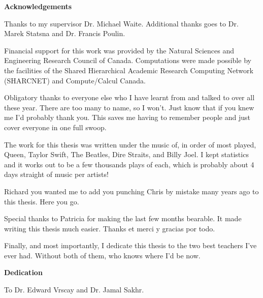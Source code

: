
\begin{center}\textbf{Acknowledgements}\end{center}
Thanks to my supervisor Dr. Michael Waite. Additional thanks goes to Dr. Marek Statsna and Dr. Francis Poulin. 

Financial support for this work was provided by the Natural Sciences and Engineering Research Council of Canada. Computations were made possible by the facilities of the Shared Hierarchical Academic Research Computing Network (SHARCNET) and Compute/Calcul Canada.

Obligatory thanks to everyone else who I have learnt from and talked to over all these year. There are too many to name, so I won't. Just know that if you knew me I'd probably thank you. This saves me having to remember people and just cover everyone in one full swoop.

The work for this thesis was written under the music of, in order of most played, Queen, Taylor Swift, The Beatles, Dire Straits, and Billy Joel. I kept statistics and it works out to be a few thousands plays of each, which is probably about 4 days straight of music per artists!

Richard you wanted me to add you punching Chris by mistake many years ago to this thesis. Here you go.

Special thanks to Patricia for making the last few months bearable. It made writing this thesis much easier. Thanks et merci y gracias por todo. 

Finally, and most importantly, I dedicate this thesis to the two best teachers I've ever had. Without both of them, who knows where I'd be now. 
\cleardoublepage


\begin{center}\textbf{Dedication}\end{center}
\begin{center}To Dr. Edward Vrscay and Dr. Jamal Sakhr.\end{center}
\cleardoublepage


\renewcommand\contentsname{Table of Contents}
\tableofcontents
\cleardoublepage
{}


